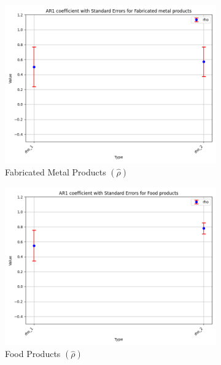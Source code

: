 \documentclass{article}
\begin{document}
\begin{figure}[ht!]
    \begin{subfigure}[t]{0.32\textwidth}
        \centering
        \includegraphics[width=\textwidth]{figure/empirical_ar1_normal_kmshare_ciiu_rho_with_error_bars_Fabricated metal products.png}
        \caption{Fabricated Metal Products $(\hat\rho)$}
    \end{subfigure}
    \begin{subfigure}[t]{0.32\textwidth}
        \centering
        \includegraphics[width=\textwidth]{figure/empirical_ar1_normal_kmshare_ciiu_rho_with_error_bars_Food products.png}
        \caption{Food Products $(\hat\rho)$}
    \end{subfigure}
    \begin{subfigure}[t]{0.32\textwidth}

\end{subfigure}
\end{figure}
\end{document}
